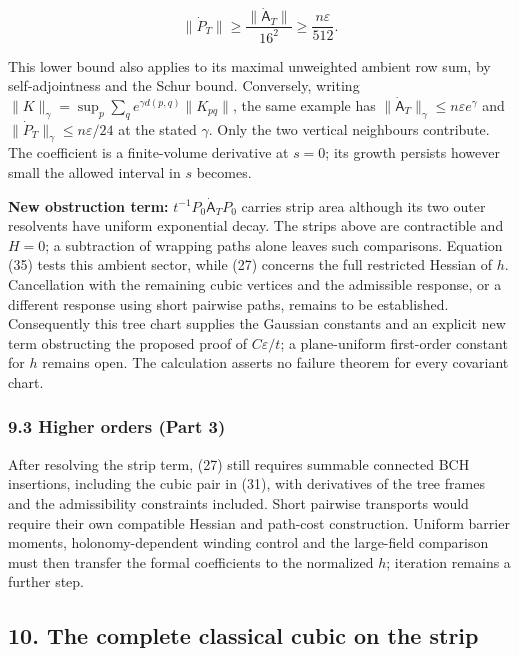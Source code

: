 \documentclass[11pt,a4paper]{article}
\begin{document}
\[\|\dot P_T\|\ge\frac{\|\dot{\mathsf A}_T\|}{16^2}
\ge\frac{n\varepsilon}{512}.\tag{35}\]

This lower bound also applies to its maximal unweighted ambient row sum,
by self-adjointness and the Schur bound. Conversely, writing
\(\|K\|_\gamma=\sup_p\sum_q e^{\gamma d(p,q)}\|K_{pq}\|\), the same
example has \(\|\dot{\mathsf A}_T\|_\gamma\le n\varepsilon e^\gamma\)
and \(\|\dot P_T\|_\gamma\le n\varepsilon/24\) at the stated \(\gamma\).
Only the two vertical neighbours contribute. The coefficient is a
finite-volume derivative at \(s=0\); its growth persists however small
the allowed interval in \(s\) becomes.

\textbf{New obstruction term:} \(t^{-1}P_0\dot{\mathsf A}_T P_0\)
carries strip area although its two outer resolvents have uniform
exponential decay. The strips above are contractible and \(H=0\); a
subtraction of wrapping paths alone leaves such comparisons. Equation
(35) tests this ambient sector, while (27) concerns the full restricted
Hessian of \(h\). Cancellation with the remaining cubic vertices and the
admissible response, or a different response using short pairwise paths,
remains to be established. Consequently this tree chart supplies the
Gaussian constants and an explicit new term obstructing the proposed
proof of \(C\varepsilon/t\); a plane-uniform first-order constant for
\(h\) remains open. The calculation asserts no failure theorem for every
covariant chart.

\hypertarget{higher-orders-part-3}{%
\subsubsection{9.3 Higher orders (Part 3)}\label{higher-orders-part-3}}

After resolving the strip term, (27) still requires summable connected
BCH insertions, including the cubic pair in (31), with derivatives of
the tree frames and the admissibility constraints included. Short
pairwise transports would require their own compatible Hessian and
path-cost construction. Uniform barrier moments, holonomy-dependent
winding control and the large-field comparison must then transfer the
formal coefficients to the normalized \(h\); iteration remains a further
step.

\hypertarget{the-complete-classical-cubic-on-the-strip}{%
\subsection{10. The complete classical cubic on the
strip}\label{the-complete-classical-cubic-on-the-strip}}
\end{document}
